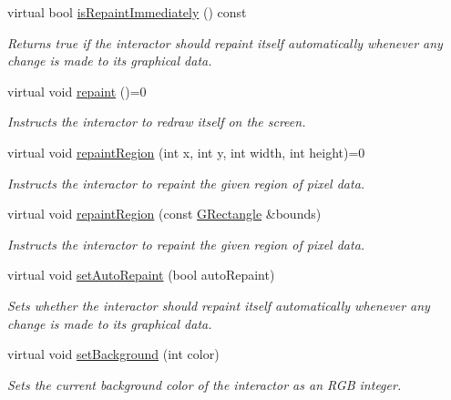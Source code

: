 \begin{DoxyCompactItemize}
virtual bool \mbox{\hyperlink{classGDrawingSurface_a82a00267c81cc0ae85ee0feb01a92fa8}{is\+Repaint\+Immediately}} () const
\begin{DoxyCompactList}\small\item\em Returns true if the interactor should repaint itself automatically whenever any change is made to its graphical data. \end{DoxyCompactList}\item 
virtual void \mbox{\hyperlink{classGDrawingSurface_a4a8ae47b42f1e6a41b65d3546df46218}{repaint}} ()=0
\begin{DoxyCompactList}\small\item\em Instructs the interactor to redraw itself on the screen. \end{DoxyCompactList}\item 
virtual void \mbox{\hyperlink{classGDrawingSurface_a1a3898317080fecf8af21bbeaeeb37c3}{repaint\+Region}} (int x, int y, int width, int height)=0
\begin{DoxyCompactList}\small\item\em Instructs the interactor to repaint the given region of pixel data. \end{DoxyCompactList}\item 
virtual void \mbox{\hyperlink{classGDrawingSurface_a769c46fb3e1004aec76e8b0adfa42aa6}{repaint\+Region}} (const \mbox{\hyperlink{structGRectangle}{G\+Rectangle}} \&bounds)
\begin{DoxyCompactList}\small\item\em Instructs the interactor to repaint the given region of pixel data. \end{DoxyCompactList}\item 
virtual void \mbox{\hyperlink{classGDrawingSurface_adf10848319457bd6df4c657bf8872bee}{set\+Auto\+Repaint}} (bool auto\+Repaint)
\begin{DoxyCompactList}\small\item\em Sets whether the interactor should repaint itself automatically whenever any change is made to its graphical data. \end{DoxyCompactList}\item 
virtual void \mbox{\hyperlink{classGDrawingSurface_aba673fd56570a074aba10fa059524b96}{set\+Background}} (int color)
\begin{DoxyCompactList}\small\item\em Sets the current background color of the interactor as an R\+GB integer. \end{DoxyCompactList}\item 

\end{DoxyCompactItemize}
